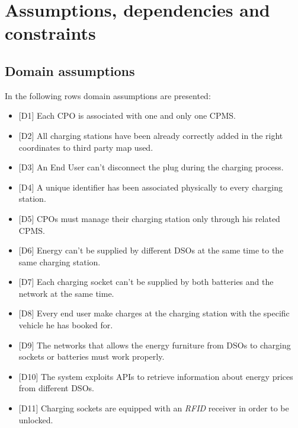 \documentclass[a4paper]{report}
\begin{document}
\section{Assumptions, dependencies and constraints}

\subsection{Domain assumptions}

In the following rows domain assumptions are presented:
\begin{itemize}
\item{[D1]} \label{D1} Each CPO is associated with one and only one CPMS.
\item{[D2]} \label{D2} All charging stations have been already correctly added in the right coordinates to third party map used.
\item{[D3]} \label{D3} An End User can't disconnect the plug during the charging process.
\item{[D4]} \label{D4} A unique identifier has been associated physically to every charging station.
\item{[D5]} \label{D5} CPOs must manage their charging station only through his related CPMS.
\item{[D6]} \label{D6} Energy can't be supplied by different DSOs at the same time to the same charging station.
\item{[D7]} \label{D7} Each charging socket can't be supplied by both batteries and the network at the same time.
\item{[D8]} \label{D8} Every end user make charges at the charging station with the specific vehicle he has booked for.
\item{[D9]} \label{D9} The networks that allows the energy furniture from DSOs to charging sockets or batteries must work properly.
\item{[D10]} \label{D10} The system exploits APIs to retrieve information about energy prices from different DSOs.
\item{[D11]} \label{D11} Charging sockets are equipped with an \textit{RFID} receiver in order to be unlocked.
\end{itemize}
\end{document}
